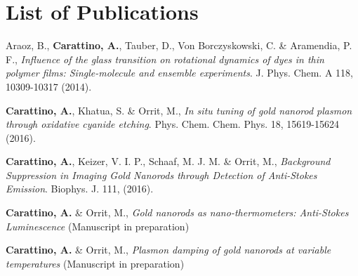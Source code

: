 \chapter*{List of Publications}
\label{publications}

\begin{etaremune}{\small

\item Araoz, B., \textbf{Carattino, A.}, Tauber, D., Von Borczyskowski, C. \&
Aramendia, P. F., \textit{Influence of the glass transition on rotational
dynamics of dyes in thin polymer films: Single-molecule and ensemble
experiments}. J. Phys. Chem. A 118, 10309-10317 (2014).
\item \textbf{Carattino, A.}, Khatua, S. \& Orrit, M., \textit{In situ tuning of
gold nanorod plasmon through oxidative cyanide etching}. Phys. Chem. Chem. Phys.
18, 15619-15624 (2016).
\item \textbf{Carattino, A.}, Keizer, V. I. P., Schaaf, M. J. M. \& Orrit, M.,
\textit{Background Suppression in Imaging Gold Nanorods through Detection of
Anti-Stokes Emission}. Biophys. J. 111, (2016).
\item \textbf{Carattino, A.} \& Orrit, M., \textit{Gold nanorods as
nano-thermometers: Anti-Stokes Luminescence} (Manuscript in preparation)
\item \textbf{Carattino, A.} \& Orrit, M., \textit{Plasmon damping of gold
nanorods at variable temperatures} (Manuscript in preparation)

}\end{etaremune}

